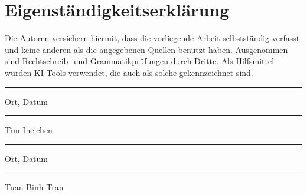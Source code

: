 \newpage
\section*{Eigenständigkeitserklärung}

Die Autoren versichern hiermit, dass die vorliegende Arbeit selbstständig verfasst und keine anderen als die angegebenen Quellen benutzt haben. 
Ausgenommen sind Rechtschreib- und Grammatikprüfungen durch Dritte. Als Hilfsmittel wurden KI-Tools verwendet, die auch als solche gekennzeichnet sind.


\vspace{2cm}

\begin{minipage}[t]{0.45\textwidth}
    \noindent\rule{4cm}{0.4pt}
    
    Ort, Datum
\end{minipage}
\begin{minipage}[t]{0.45\textwidth}
    \noindent\rule{5cm}{0.4pt}
    
    Tim Ineichen
\end{minipage}

\vspace{2cm}

\begin{minipage}[t]{0.45\textwidth}
    \noindent\rule{4cm}{0.4pt}
    
    Ort, Datum
\end{minipage}
\begin{minipage}[t]{0.45\textwidth}
    \noindent\rule{5cm}{0.4pt}
    
    Tuan Binh Tran
\end{minipage}

\newpage